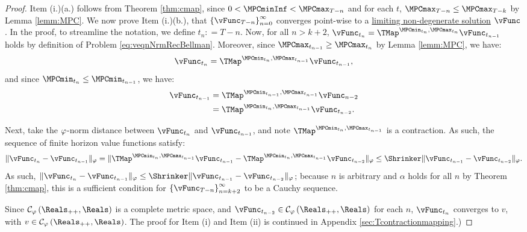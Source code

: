 \documentclass[BufferStockTheory]{subfiles}
\begin{document}
\begin{proof}

Item (i.)(a.) follows from Theorem \ref{thm:cmap}, since $0<\MPCminInf<\MPCmax_{T-n}$ and for each $t$, $\MPCmax_{T-n}\leq \MPCmax_{T-k}$ by Lemma \ref{lemm:MPC}.
We now prove Item (i.)(b.), that $\left\{\vFunc_{T-n}\right\}_{n=0}^{\infty}$ converges point-wise to a \hyperlink{Definition-of-a-non-degenerate-Solution}{limiting non-degenerate solution} $\vFunc$.
In the proof, to streamline the notation, we define $t_{n}\colon = T - n$.
Now, for all $n>k+2$, $\vFunc_{t_{n}} = \TMap^{\MPCmin_{t_{n}}, \MPCmax_{t_{n}}}\vFunc_{t_{n-1}}$ holds by definition of Problem \eqref{eq:veqnNrmRecBellman}.
Moreover, since $\MPCmax_{t_{n-1}}\geq \MPCmax_{t_{n}}$ by Lemma \ref{lemm:MPC}, we have:
%
\begin{equation*}
\vFunc_{t_{n}} = \TMap^{\MPCmin_{t_{n}}, \MPCmax_{t_{n-1}}}\vFunc_{t_{n-1}}, 
\end{equation*}
%
and since $\MPCmin_{t_{n}}\leq \MPCmin_{t_{n-1}}$, we have:
%
\begin{equation}\begin{gathered}\begin{aligned}
\vFunc_{t_{n-1}} &  = \TMap^{\MPCmin_{t_{n-1}}, \MPCmax_{t_{n-1}}}\vFunc_{n-2}\\ &  = \TMap^{\MPCmin_{t_{n}}, \MPCmax_{t_{n-1}}}\vFunc_{t_{n-2}}. 
\end{aligned}\end{gathered}\end{equation}

Next, take the $\varphi$-norm distance between $\vFunc_{t_{n}}$ and $\vFunc_{t_{n-1}}$, and note  $\TMap^{\MPCmin_{t_{n}}, \MPCmax_{t_{n-1}}}$ is a contraction.
As such, the sequence of finite horizon value functions satisfy:
%
\begin{equation*}
\Vert\vFunc_{t_{n}} - \vFunc_{t_{n-1}}\Vert_{\boundFunc} = \Vert\TMap^{\MPCmin_{t_{n}}, \MPCmax_{t_{n-1}}}\vFunc_{t_{n-1}} - \TMap^{\MPCmin_{t_{n}}, \MPCmax_{t_{n-1}}}\vFunc_{t_{n-2}}\Vert_{\boundFunc} \leq \Shrinker \Vert \vFunc_{t_{n-1}} - \vFunc_{t_{n-2}}\Vert_{\boundFunc}. 
\end{equation*}
%
As such, $\Vert \vFunc_{t_{n}} - \vFunc_{t_{n-1}}\Vert_{\boundFunc } \leq \Shrinker \Vert \vFunc_{t_{n-1}} - \vFunc_{t_{n-2}}\Vert_{\boundFunc } $; because $n$ is arbitrary and $\alpha$ holds for all $n$ by Theorem \ref{thm:cmap}, this is a sufficient condition for  $\left\{\vFunc_{T-n}\right\}_{n=k+2}^{\infty}$ to be a Cauchy sequence.

Since $\mathcal{C}_{\boundFunc }\left(\Reals_{++},\Reals\right) $ is a complete metric space, and $\vFunc_{t_{n-2}} \in \mathcal{C}_{\boundFunc }\left(\Reals_{++},\Reals\right)$ for each $n$, $\vFunc_{t_{n}}$ converges to $v$, with $v\in \mathcal{C}_{\boundFunc }\left(\Reals_{++},\Reals\right)$.
The proof for Item (i) and Item (ii) is continued in Appendix \ref{sec:Tcontractionmapping}.)
\end{proof}
\end{document}

